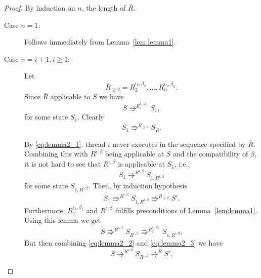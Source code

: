 \begin{proof}
  By induction on $n$, the length of $\bar{R}$.
  \begin{description}
    \item[Case $n = 1$:] Follows immediately from Lemma~\ref{lem:lemma1}.
    \item[Case $n = i+1, i \geq 1$:] Let
      \begin{equation*}
        \bar{R}_{\geq 2} = R_2^{\iota_2, \beta_2}, \dots, R_n^{\iota_n, \beta_n}.
      \end{equation*}
      Since $\bar{R}$ applicable to $S$ we have 
      \begin{equation}
        S \Rrightarrow^{R_1^{\iota_1, \beta_1}} S_1,
      \end{equation}
      for some state $S_1$. Clearly
      \begin{equation}
        S_1 \Rrightarrow^{\bar{R}_{\geq 2}} S_{\bar{R}}.
      \end{equation}
      
      By \eqref{eq:lemma2_1}, thread $\iota$ never executes in the sequence
      specified by $\bar{R}$. Combining this with $R^{\iota, \beta}$ being
      applicable at $S$ and the compatibility of $\beta$, it is not hard to see
      that $R^{\iota, \beta}$ is applicable at $S_1$, i.e.,
      \begin{equation}
        S_1 \Rrightarrow^{R^{\iota, \beta}} S_{1,R^{\iota, \beta}}
      \end{equation}
      for some state $S_{1,R^{\iota, \beta}}$. Then, by induction hypothesis
      \begin{equation} \label{eq:lemma2_2}
        S_1 \Rrightarrow^{R^{\iota, \beta}} S_{1,R^{\iota, \beta}} \Rrightarrow^{\bar{R}_{\geq 2}} S'.
      \end{equation}
      Furthermore, $R_1^{\iota_1, \beta_1}$ and $R^{\iota, \beta}$ fulfills
      preconditions of Lemma~\ref{lem:lemma1}. Using this lemma we get
      \begin{equation} \label{eq:lemma2_3}
        S \Rrightarrow^{R^{\iota, \beta}} S_{R^{\iota, \beta}}
        \Rrightarrow^{R_1^{\iota_1, \beta_1}} S_{1, R^{\iota, \beta}}.
      \end{equation}
      But then combining \eqref{eq:lemma2_2} and \eqref{eq:lemma2_3} we have
      \begin{equation}
        S \Rrightarrow^{R^{\iota, \beta}} S_{R^{\iota, \beta}} \Rrightarrow^{\bar{R}} S'.
      \end{equation}
  \end{description}
\end{proof}


